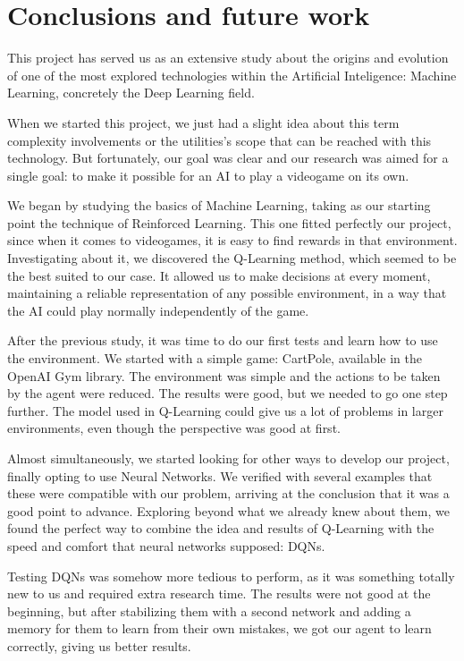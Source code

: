 \chapter{Conclusions and future work}
\label{cap:conclusions}


This project has served us as an extensive study about the origins and evolution of one of the most explored technologies within the Artificial Inteligence: Machine Learning, concretely the Deep Learning field.

When we started this project, we just had a slight idea about this term complexity involvements or the utilities's scope that can be reached with this technology. But fortunately, our goal was clear and our research was aimed for a single goal: to make it possible for an AI to play a videogame on its own.

We began by studying the basics of Machine Learning, taking as our starting point the technique of Reinforced Learning. This one fitted perfectly our project, since when it comes to videogames, it is easy to find rewards in that environment. Investigating about it, we discovered the Q-Learning method, which seemed to be the best suited to our case. It allowed us to make decisions at every moment, maintaining a reliable representation of any possible environment, in a way that the AI could play normally independently of the game.

After the previous study, it was time to do our first tests and learn how to use the environment. We started with a simple game: CartPole, available in the OpenAI Gym library. The environment was simple and the actions to be taken by the agent were reduced. The results were good, but we needed to go one step further. The model used in Q-Learning could give us a lot of problems in larger environments, even though the perspective was good at first.

Almost simultaneously, we started looking for other ways to develop our project, finally opting to use Neural Networks. We verified with several examples that these were compatible with our problem, arriving at the conclusion that it was a good point to advance. Exploring beyond what we already knew about them, we found the perfect way to combine the idea and results of Q-Learning with the speed and comfort that neural networks supposed: DQNs.

Testing DQNs was somehow more tedious to perform, as it was something totally new to us and required extra research time. The results were not good at the beginning, but after stabilizing them with a second network and adding a memory for them to learn from their own mistakes, we got our agent to learn correctly, giving us better results.

